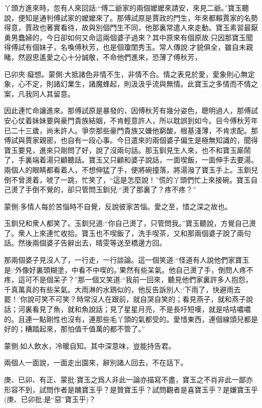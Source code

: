 \begin{parag}
    丫頭方進來時，忽有人來回話:“傅二爺家的兩個嬤嬤來請安，來見二爺。”寶玉聽說，便知是通判傅試家的嬤嬤來了。那傅試原是賈政的門生，年來都賴賈家的名勢得意，賈政也著實看待，故與別個門生不同，他那裏常遣人來走動。寶玉素習最厭勇男蠢婦的，今日卻如何又命這兩個婆子過來？其中原來有個原故:只因那寶玉聞得傅試有個妹子，名喚傅秋芳，也是個瓊閨秀玉。常人傳說:才貌俱全，雖自未親睹，然遐思遙愛之心十分誠敬，不命他們進來，恐薄了傅秋芳，\begin{note}已卯夾:癡想。蒙側:大抵諸色非情不生，非情不合。情之表見於愛，愛象則心無定象，心不定，則諸幻業生，諸魔蜂起，則汲汲乎流與無情。此寶玉之多情而不情之案，凡我同人其留意。\end{note}因此連忙命讓進來。那傅試原是暴發的，因傅秋芳有幾分姿色，聰明過人，那傅試安心仗着妹妹要與豪門貴族結姻，不肯輕意許人，所以耽誤到如今。目今傅秋芳年已二十三歲，尚未許人。爭奈那些豪門貴族又嫌他窮酸，根基淺薄，不肯求配。那傅試與賈家親密，也自有一段心事。今日遣來的兩個婆子偏生是極無知識的，聞得寶玉要見，進來只剛問了好，說了沒兩句話。那玉釧見生人來，也不和寶玉廝鬧了，手裏端着湯只顧聽話。寶玉又只顧和婆子說話，一面喫飯，一面伸手去要湯。兩個人的眼睛都看着人，不想伸猛了手，便將碗撞落，將湯潑了寶玉手上。玉釧兒倒不曾燙着，唬了一跳，忙笑了，“這是怎麼說！”慌的丫頭們忙上來接碗。寶玉自己燙了手倒不覺的，卻只管問玉釧兒:“燙了那裏了？疼不疼？”\begin{note}蒙側:多情人每於苦惱時不自覺，反說彼家苦惱。愛之至，惜之深之故也。\end{note}玉釧兒和衆人都笑了。玉釧兒道:“你自己燙了，只管問我。”寶玉聽說，方覺自己燙了。衆人上來連忙收拾。寶玉也不喫飯了，洗手喫茶，又和那兩個婆子說了兩句話。然後兩個婆子告辭出去，晴雯等送至橋邊方回。
\end{parag}


\begin{parag}
    那兩個婆子見沒人了，一行走，一行談論。這一個笑道:“怪道有人說他們家寶玉是:‘外像好裏頭糊塗，中看不中喫的。’果然有些呆氣。他自己燙了手，倒問人疼不疼，這可不是個呆子？”那一個又笑道:“我前一回來，聽見他們家裏許多人抱怨，千真萬真的有些呆氣。大雨淋的水鶏似的，他反告訴別人:‘下雨了，快避雨去罷！’你說可笑不可笑？時常沒人在跟前，就自哭自笑的；看見燕子，就和燕子說話；河裏看見了魚，就和魚說話；見了星星月亮，不是長吁短嘆，就是咭咭噥噥的。且連一點剛性也沒有，連那些毛丫頭的氣都受的。愛惜東西，連個線頭兒都是好的；糟踏起來，那怕值千值萬的都不管了。”\begin{note}蒙側:如人飲水，冷暖自知。其中深意味，豈能持告君。\end{note}兩個人一面說，一面走出園來，辭別諸人回去，不在話下。\begin{note}庚、已卯、有正、蒙批:寶玉之爲人非此一論亦描寫不盡，寶玉之不肖非此一鄙亦形容不到，試問作者是醜寶玉乎？是贊寶玉乎？試問觀者是喜寶玉乎？是嫌寶玉乎(庚、已卯批:是“惡”寶玉乎)？\end{note}
\end{parag}


